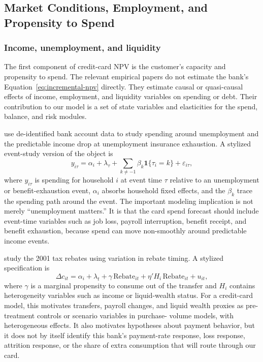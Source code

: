 \documentclass[11pt]{article}
\newcommand{\1}{\mathbf{1}}
\begin{document}
\subsection{Market Conditions, Employment, and Propensity to Spend}
\label{sec:macro}

\subsubsection{Income, unemployment, and liquidity}

The first component of credit-card NPV is the customer's capacity and propensity
to spend. The relevant empirical papers do not estimate the bank's
Equation~\eqref{eq:incremental-npv} directly. They estimate causal or
quasi-causal effects of income, employment, and liquidity variables on spending
or debt. Their contribution to our model is a set of state variables and
elasticities for the spend, balance, and risk modules.

\citet{ganong2019unemployment} use de-identified bank account data to study
spending around unemployment and the predictable income drop at unemployment
insurance exhaustion. A stylized event-study version of the object is
\begin{equation}
  y_{i\tau}
  =
  \alpha_i + \lambda_\tau
  + \sum_{k \neq -1} \beta_k \1\{\tau_i = k\}
  + \varepsilon_{i\tau},
  \label{eq:unemployment-event-study}
\end{equation}
where $y_{i\tau}$ is spending for household $i$ at event time $\tau$ relative to
an unemployment or benefit-exhaustion event, $\alpha_i$ absorbs household fixed
effects, and the $\beta_k$ trace the spending path around the event. The
important modeling implication is not merely ``unemployment matters.'' It is
that the card spend forecast should include event-time variables such as job
loss, payroll interruption, benefit receipt, and benefit exhaustion, because
spend can move non-smoothly around predictable income events.

\citet{johnson2004rebates} study the 2001 tax rebates using variation in rebate
timing. A stylized specification is
\begin{equation}
  \Delta c_{it}
  =
  \alpha_i + \lambda_t
  + \gamma\,\mathrm{Rebate}_{it}
  + \eta' H_i\,\mathrm{Rebate}_{it}
  + u_{it},
  \label{eq:rebate-mpc}
\end{equation}
where $\gamma$ is a marginal propensity to consume out of the transfer and
$H_i$ contains heterogeneity variables such as income or liquid-wealth status.
For a credit-card model, this motivates transfers, payroll changes, and liquid
wealth proxies as pre-treatment controls or scenario variables in purchase-
volume models, with heterogeneous effects. It also motivates hypotheses about
payment behavior, but it does not by itself identify this bank's payment-rate
response, loss response, attrition response, or the share of extra consumption
that will route through our card.
\end{document}

